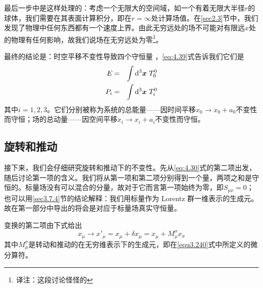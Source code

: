 最后一步中是这样处理的：考虑一个无限大的空间域，如一个有着无限大半径$r$的球体，我们需要在其表面计算积分，即在$r=\infty$处计算场值。在\ref{sec2.3}节中，我们发现了物理中任何东西都有一个速度上界。由此无穷远处的场不可能对有限远$x$处的物理有任何影响，故我们说场在无穷远处为零\footnote{译注：这段讨论怪怪的}。

最终的结论是：时空平移不变性导致四个守恒量%
%
，\ref{eq:4.39}式告诉我们它们是
\begin{eqnarray}
E &=& \int\mathrm d^3\bm{x}~T_0^0 \\
P_i &=& \int\mathrm d^3\bm{x}~T_i^0 \label{eq:4.41}
\end{eqnarray}
其中$i=1,2,3$。它们分别被称为系统的总能量——因时间平移$x_0\rightarrow x_0+a_0$不变性而守恒；场的总动量——因空间平移$x_i\rightarrow x_i+a_i$不变性而守恒。

\subsection{旋转和推动}\label{sec4.5.3}
接下来，我们会仔细研究旋转和推动下的不变性。先从\ref{eq:4.30}式的第二项出发，随后讨论第一项的含义。我们将从第一项和第二项分别得到一个量，两项之和是守恒的。标量场没有可以混合的分量，故对于它而言第一项始终为零，即$S_{\mu\nu}=0$；也可以用\ref{sec3.7.4}节的结论解释：我们用标量作为 Lorentz 群一维表示的生成元。故在第一部分中导出的将会是对应于标量场真实守恒量。

变换的第二项由下式给出
\[
x_\mu \rightarrow {x'}_\mu = x_\mu + \delta x_\mu = x_\mu + M_\mu^\sigma x_\sigma
\]
其中$M_\mu^\sigma$是转动和推动的在无穷维表示下的生成元，即在\ref{equ3.240}式中所定义的微分算符。

